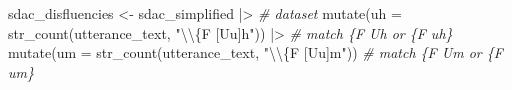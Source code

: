 \documentclass[
  letterpaper,
]{scrbook}
\newenvironment{Shaded}{\begin{snugshade}}{\end{snugshade}}
\newcommand{\AttributeTok}[1]{\textcolor[rgb]{0.00,0.00,0.00}{#1}}
\newcommand{\CommentTok}[1]{\textcolor[rgb]{0.00,0.00,0.00}{\textit{#1}}}
\newcommand{\FunctionTok}[1]{\textcolor[rgb]{0.00,0.00,0.00}{#1}}
\newcommand{\NormalTok}[1]{\textcolor[rgb]{0.00,0.00,0.00}{#1}}
\newcommand{\OtherTok}[1]{\textcolor[rgb]{0.00,0.00,0.00}{#1}}
\newcommand{\SpecialCharTok}[1]{\textcolor[rgb]{0.00,0.00,0.00}{#1}}
\newcommand{\StringTok}[1]{\textcolor[rgb]{0.00,0.00,0.00}{#1}}
\begin{document}
\begin{Shaded}
\begin{Highlighting}[]
\NormalTok{sdac\_disfluencies }\OtherTok{\textless{}{-}} 
\NormalTok{  sdac\_simplified }\SpecialCharTok{|\textgreater{}} \CommentTok{\# dataset}
  \FunctionTok{mutate}\NormalTok{(}\AttributeTok{uh =} \FunctionTok{str\_count}\NormalTok{(utterance\_text, }\StringTok{"}\SpecialCharTok{\textbackslash{}\textbackslash{}}\StringTok{\{F [Uu]h"}\NormalTok{)) }\SpecialCharTok{|\textgreater{}} \CommentTok{\# match \{F Uh or \{F uh\}}
  \FunctionTok{mutate}\NormalTok{(}\AttributeTok{um =} \FunctionTok{str\_count}\NormalTok{(utterance\_text, }\StringTok{"}\SpecialCharTok{\textbackslash{}\textbackslash{}}\StringTok{\{F [Uu]m"}\NormalTok{)) }\CommentTok{\# match \{F Um or \{F um\}}
\end{Highlighting}
\end{Shaded}
\end{document}
